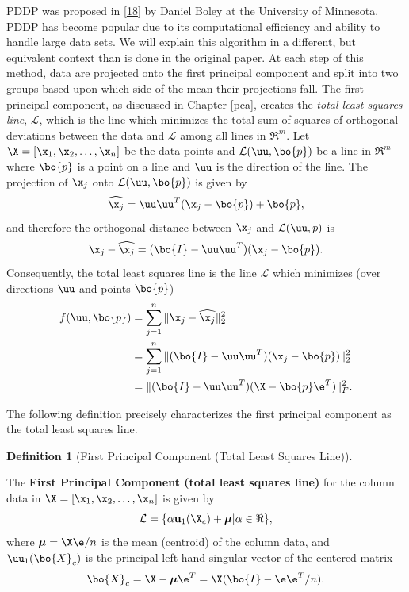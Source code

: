 \documentclass[
]{article}
\theoremstyle{definition}
\newtheorem{definition}{Definition}[section]
\theoremstyle{definition}
\theoremstyle{definition}
\theoremstyle{definition}
\theoremstyle{remark}
\begin{document}
PDDP was proposed in \protect\hyperlink{ref-boleypddp}{{[}18{]}} by Daniel Boley at the University of Minnesota. PDDP has become popular due to its computational efficiency and ability to handle large data sets. We will explain this algorithm in a different, but equivalent context than is done in the original paper. At each step of this method, data are projected onto the first principal component and split into two groups based upon which side of the mean their projections fall. The first principal component, as discussed in Chapter \ref{pca}, creates the \emph{total least squares line}, \(\mathcal{L}\), which is the line which minimizes the total sum of squares of orthogonal deviations between the data and \(\mathcal{L}\) among all lines in \(\Re^m\). Let \(\X=[\x_1,\x_2,\dots,\x_n]\) be the data points and \(\mathcal{L}(\uu,\bo{p})\) be a line in \(\Re^m\) where \(\bo{p}\) is a point on a line and \(\uu\) is the direction of the line. The projection of \(\x_j\) onto \(\mathcal{L}(\uu,\bo{p})\) is given by
\[\widehat{\x_j} = \uu\uu^T(\x_j-\bo{p})+\bo{p},\]
and therefore the orthogonal distance between \(\x_j\) and \(\mathcal{L}(\uu,p)\) is
\[\x_j - \widehat{\x_j} = (\bo{I}-\uu\uu^T)(\x_j-\bo{p}).\]
Consequently, the total least squares line is the line \(\mathcal{L}\) which minimizes (over directions \(\uu\) and points \(\bo{p}\))
\begin{equation*}
\begin{split}
f(\uu,\bo{p}) &= \sum_{j=1}^{n} \|\x_j - \widehat{\x_j}\|_2^2\\
&=\sum_{j=1}^{n} \|(\bo{I}-\uu\uu^T)(\x_j-\bo{p})\|_2^2\\
&= \|(\bo{I}-\uu\uu^T)(\X-\bo{p}\e^T)\|_F^2.
\end{split}
\end{equation*}

The following definition precisely characterizes the first principal component as the total least squares line.

\begin{definition}[First Principal Component (Total Least Squares Line)]
\protect\hypertarget{def:rowcol}{}\label{def:rowcol}

The \textbf{First Principal Component (total least squares line)} for the column data in \(\X=[\x_1,\x_2,\dots,\x_n]\) is given by
\[\mathcal{L} = \{\alpha \mathbf{u}_1(\X_c) + \boldsymbol\mu | \alpha \in \Re\},\]
where \(\boldsymbol\mu= \X\e/n\) is the mean (centroid) of the column data, and \(\uu_1(\bo{X}_c)\) is the principal left-hand singular vector of the centered matrix
\[\bo{X}_c=\X-\boldsymbol\mu\e^T = \X(\bo{I}-\e\e^T/n).\]

\end{definition}
\end{document}
